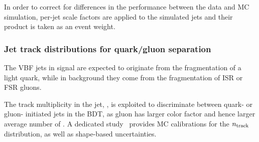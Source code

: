
In order to correct for differences in the \btagging performance between the data and MC simulation, per-jet scale factors are applied to the simulated jets and their product is taken as an event weight.

\subsubsection{Jet track distributions for quark/gluon separation}
\label{sec:vbf-qgtagging}

The VBF jets in signal are expected to originate from the fragmentation of a light quark, 
while in background they come from the fragmentation of ISR or FSR gluons.

The track multiplicity in the jet, \ntrk, is exploited to discriminate between quark- or gluon- initiated jets in the BDT, as gluon has larger color factor and hence larger average number of \ntrk. A dedicated study~\cite{qgtagging}  provides MC calibrations for the $n_{\rm track}$ distribution, as well as shape-based uncertainties.

